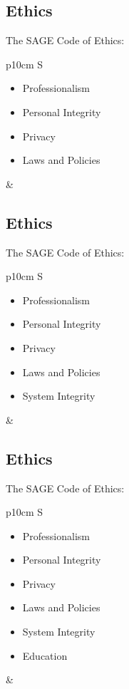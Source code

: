 \documentclass[xga]{xdvislides}
\begin{document}
\subsection{Ethics}
The SAGE Code of Ethics:
\\

\begin{tabular}{ p{10cm} S }
\begin{itemize}
	\item Professionalism
	\item Personal Integrity
	\item Privacy
	\item Laws and Policies
\end{itemize}
&  \\
\end{tabular}


\subsection{Ethics}
The SAGE Code of Ethics:
\\

\begin{tabular}{ p{10cm} S }
\begin{itemize}
	\item Professionalism
	\item Personal Integrity
	\item Privacy
	\item Laws and Policies
	\item System Integrity
\end{itemize}
&  \\
\end{tabular}


\subsection{Ethics}
The SAGE Code of Ethics:
\\

\begin{tabular}{ p{10cm} S }
\begin{itemize}
	\item Professionalism
	\item Personal Integrity
	\item Privacy
	\item Laws and Policies
	\item System Integrity
	\item Education
\end{itemize}
&  \\
\end{tabular}
\end{document}
